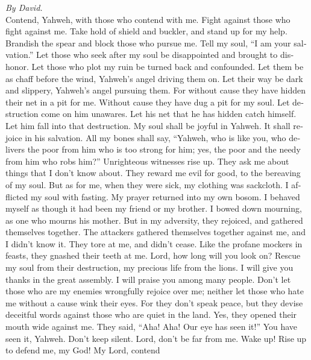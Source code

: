 \begin{paracol}{2}
\begin{otherlanguage}{english}
\emph{By David.}\\
 Contend, Yahweh, with those who contend with me. Fight
against those who fight against me.  Take hold of shield
and buckler, and stand up for my help.  Brandish the spear
and block those who pursue me. Tell my soul, ``I am your salvation.''
 Let those who seek after my soul be disappointed and
brought to dishonor. Let those who plot my ruin be turned back and
confounded.  Let them be as chaff before the wind,
Yahweh's angel driving them on.  Let their way be dark and
slippery, Yahweh's angel pursuing them.  For without cause
they have hidden their net in a pit for me. Without cause they have dug
a pit for my soul.  Let destruction come on him unawares.
Let his net that he has hidden catch himself. Let him fall into that
destruction.  My soul shall be joyful in Yahweh. It shall
rejoice in his salvation.  All my bones shall say,
``Yahweh, who is like you, who delivers the poor from him who is too
strong for him; yes, the poor and the needy from him who robs him?''
 Unrighteous witnesses rise up. They ask me about things
that I don't know about.  They reward me evil for good,
to the bereaving of my soul.  But as for me, when they
were sick, my clothing was sackcloth. I afflicted my soul with fasting.
My prayer returned into my own bosom.  I behaved myself
as though it had been my friend or my brother. I bowed down mourning, as
one who mourns his mother.  But in my adversity, they
rejoiced, and gathered themselves together. The attackers gathered
themselves together against me, and I didn't know it. They tore at me,
and didn't cease.  Like the profane mockers in feasts,
they gnashed their teeth at me.  Lord, how long will you
look on? Rescue my soul from their destruction, my precious life from
the lions.  I will give you thanks in the great assembly.
I will praise you among many people.  Don't let those who
are my enemies wrongfully rejoice over me; neither let those who hate me
without a cause wink their eyes.  For they don't speak
peace, but they devise deceitful words against those who are quiet in
the land.  Yes, they opened their mouth wide against me.
They said, ``Aha! Aha! Our eye has seen it!''  You have
seen it, Yahweh. Don't keep silent. Lord, don't be far from me.
 Wake up! Rise up to defend me, my God! My Lord, contend

\end{otherlanguage}
\end{paracol}
